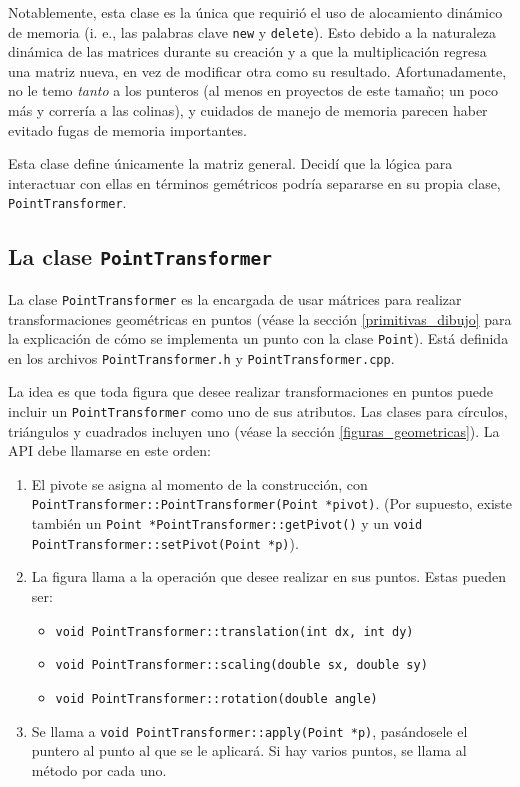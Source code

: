 Notablemente, esta clase es la única que requirió el uso de alocamiento dinámico de
memoria (i. e., las palabras clave \lstinline!new! y \lstinline!delete!). Esto
debido a la naturaleza dinámica de las matrices durante su creación y a que la multiplicación
regresa una matriz nueva, en vez de modificar otra como su resultado. Afortunadamente,
no le temo \emph{tanto} a los punteros (al menos en proyectos de este tamaño; un poco
más y correría a las colinas), y cuidados de manejo de memoria parecen haber evitado
fugas de memoria importantes.

Esta clase define únicamente la matriz general. Decidí que la lógica para interactuar
con ellas en términos gemétricos podría separarse en su propia clase, \lstinline!PointTransformer!.

\subsection{La clase \lstinline!PointTransformer!}

La clase \lstinline!PointTransformer! es la encargada de usar mátrices para realizar
transformaciones geométricas en puntos (véase la sección \ref{primitivas_dibujo} para la explicación
de cómo se implementa un punto con la clase \lstinline!Point!). Está definida en los
archivos \lstinline!PointTransformer.h! y \lstinline!PointTransformer.cpp!.

La idea es que toda figura que desee realizar transformaciones en puntos puede incluir un
\lstinline!PointTransformer! como uno de sus atributos. Las clases para círculos,
triángulos y cuadrados incluyen uno (véase la sección \ref{figuras_geometricas}). La API debe llamarse
en este orden:
\begin{enumerate}
	\item El pivote se asigna al momento de la construcción, con
	\lstinline!PointTransformer::PointTransformer(Point *pivot)!. (Por supuesto,
	existe también un \lstinline!Point *PointTransformer::getPivot()! y un \lstinline!void PointTransformer::setPivot(Point *p)!).
	\item La figura llama a la operación que desee realizar en sus puntos. Estas pueden
	ser:
	\begin{itemize}
		\item \lstinline!void PointTransformer::translation(int dx, int dy)!
		\item \lstinline!void PointTransformer::scaling(double sx, double sy)!
		\item \lstinline!void PointTransformer::rotation(double angle)!
	\end{itemize}
	\item Se llama a \lstinline!void PointTransformer::apply(Point *p)!, pasándosele
	el puntero al punto al que se le aplicará. Si hay varios puntos, se llama
	al método por cada uno.
\end{enumerate}

